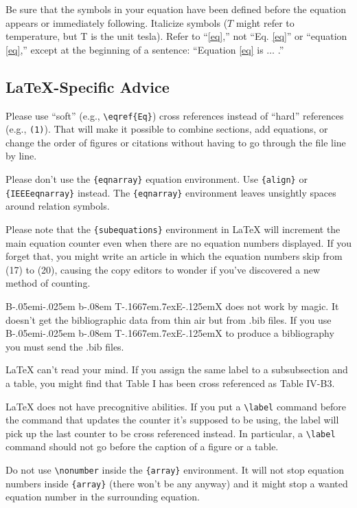 \documentclass[journal,twoside,web]{ieeecolor}
\def\BibTeX{{\rm B\kern-.05em{\sc i\kern-.025em b}\kern-.08em
    T\kern-.1667em\lower.7ex\hbox{E}\kern-.125emX}}
\begin{document}
Be sure that the symbols in your equation have been defined before the 
equation appears or immediately following. Italicize symbols ($T$ might refer 
to temperature, but T is the unit tesla). Refer to ``\eqref{eq},'' not ``Eq. \eqref{eq}'' 
or ``equation \eqref{eq},'' except at the beginning of a sentence: ``Equation \eqref{eq} 
is $\ldots$ .''

\subsection{\LaTeX-Specific Advice}

Please use ``soft'' (e.g., \verb|\eqref{Eq}|) cross references instead
of ``hard'' references (e.g., \verb|(1)|). That will make it possible
to combine sections, add equations, or change the order of figures or
citations without having to go through the file line by line.

Please don't use the \verb|{eqnarray}| equation environment. Use
\verb|{align}| or \verb|{IEEEeqnarray}| instead. The \verb|{eqnarray}|
environment leaves unsightly spaces around relation symbols.

Please note that the \verb|{subequations}| environment in {\LaTeX}
will increment the main equation counter even when there are no
equation numbers displayed. If you forget that, you might write an
article in which the equation numbers skip from (17) to (20), causing
the copy editors to wonder if you've discovered a new method of
counting.

{\BibTeX} does not work by magic. It doesn't get the bibliographic
data from thin air but from .bib files. If you use {\BibTeX} to produce a
bibliography you must send the .bib files. 

{\LaTeX} can't read your mind. If you assign the same label to a
subsubsection and a table, you might find that Table I has been cross
referenced as Table IV-B3. 

{\LaTeX} does not have precognitive abilities. If you put a
\verb|\label| command before the command that updates the counter it's
supposed to be using, the label will pick up the last counter to be
cross referenced instead. In particular, a \verb|\label| command
should not go before the caption of a figure or a table.

Do not use \verb|\nonumber| inside the \verb|{array}| environment. It
will not stop equation numbers inside \verb|{array}| (there won't be
any anyway) and it might stop a wanted equation number in the
surrounding equation.
\end{document}

